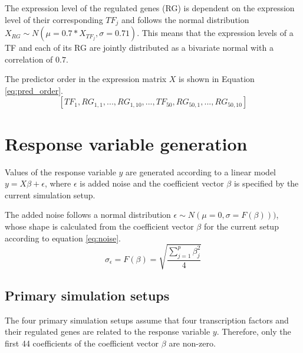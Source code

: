 The expression level of the regulated genes (RG) is dependent on the expression level of their corresponding $TF_j$ and follows the normal distribution $X_{RG} \sim N(\mu = 0.7*X_{TF_j}, \sigma = 0.71)$. This means that the expression levels of a TF and each of its RG are jointly distributed as a bivariate normal with a correlation of $0.7$.

The predictor order in the expression matrix $X$ is shown in Equation \ref{eq:pred_order}.
\begin{equation} \label{eq:pred_order}
[TF_1, RG_{1,1}, ..., RG_{1,10}, ..., TF_{50}, RG_{50,1}, ..., RG_{50,10}]
\end{equation} 


\section{Response variable generation}
Values of the response variable $y$ are generated according to a linear model $y = X\beta + \epsilon$, where $\epsilon$ is added noise and the coefficient vector $\beta$ is specified by the current simulation setup.

The added noise follows a normal distribution $\epsilon \sim N(\mu = 0, \sigma = F(\beta)))$, whose shape is calculated from the coefficient vector $\beta$ for the current setup according to equation \ref{eq:noise}.
\begin{equation} \label{eq:noise}
\sigma_\epsilon = F(\beta) = \sqrt{\frac{\sum_{j=1}^{p}\beta_j^2}{4}}
\end{equation}


\subsection{Primary simulation setups} \label{sec:prim_sim_setups}
The four primary simulation setups assume that four transcription factors and their regulated genes are related to the response variable $y$. Therefore, only the first 44 coefficients of the coefficient vector $\beta$ are non-zero.

